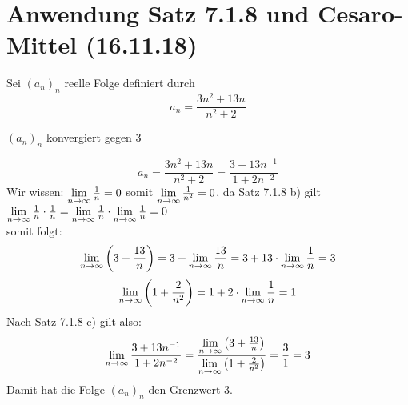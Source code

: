 \documentclass[../ana1u.tex]{subfiles}
\begin{document}
\setcounter{section}{3}

\section{Anwendung Satz 7.1.8 und Cesaro-Mittel (16.11.18)}
\begin{bsp}
    Sei \((a_n)_n\) reelle Folge definiert durch
    \[a_n = \frac{3n^2+13n}{n^2+2}\]
    \begin{beh}
        \((a_n)_n\) konvergiert gegen \(3\)
    \end{beh}
    \begin{bew}
        \[a_n = \frac{3n^2+13n}{n^2+2} = \frac{3 + 13n^{-1}}{1 + 2n^{-2}}\]
        Wir wissen: \(\lim\limits_{n\rightarrow\infty} \frac{1}{n} = 0\) somit \(\lim\limits_{n\rightarrow\infty} \frac{1}{n^2} = 0\), da Satz 7.1.8 b) gilt\\
        \(\lim\limits_{n\rightarrow\infty} \frac{1}{n} \cdot \frac{1}{n} = \lim\limits_{n\rightarrow\infty} \frac{1}{n} \cdot \lim\limits_{n\rightarrow\infty} \frac{1}{n} = 0\)\\
        somit folgt:
        \[\lim\limits_{n\rightarrow\infty} \left(3+\frac{13}{n}\right) = 3 + \lim\limits_{n\rightarrow\infty} \frac{13}{n} = 3 + 13 \cdot \lim\limits_{n\rightarrow\infty} \frac{1}{n} = 3\]
        \[\lim\limits_{n\rightarrow\infty} \left(1 + \frac{2}{n^2}\right) = 1 + 2 \cdot \lim\limits_{n\rightarrow\infty} \frac{1}{n} = 1\]
        Nach Satz 7.1.8 c) gilt also:
        \[\lim\limits_{n\rightarrow\infty} \frac{3 + 13n^{-1}}{1 + 2n^{-2}} = \frac{\lim\limits_{n\rightarrow\infty} \left(3+\frac{13}{n}\right)}{\lim\limits_{n\rightarrow\infty} \left(1 + \frac{2}{n^2}\right)} = \frac{3}{1} = 3\]
        Damit hat die Folge \((a_n)_n\) den Grenzwert 3.
    \end{bew}
\end{bsp}
\end{document}
